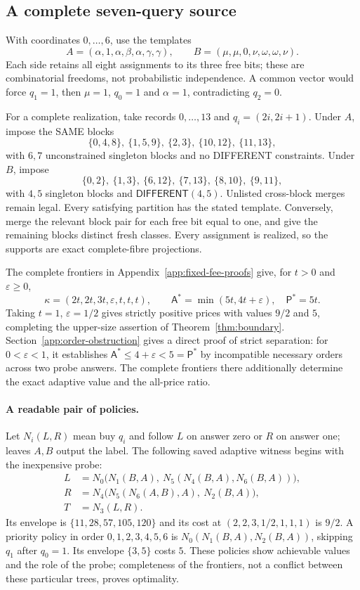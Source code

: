 \documentclass[pdflatex,sn-mathphys-num]{sn-jnl}
\newcommand{\A}{\mathsf{A}}
\newcommand{\Pcost}{\mathsf{P}}
\newcommand{\DIFF}{\mathsf{DIFFERENT}}
\theoremstyle{thmstyleone}
\theoremstyle{thmstylethree}
\theoremstyle{thmstyletwo}
\begin{document}
\subsection{A complete seven-query source}\label{sec:seven}
With coordinates $0,\ldots,6$, use the templates
\[
 A=(\alpha,1,\alpha,\beta,\alpha,\gamma,\gamma),\qquad
 B=(\mu,\mu,0,\nu,\omega,\omega,\nu).
\]
Each side retains all eight assignments to its three free bits; these are combinatorial freedoms, not probabilistic independence. A common vector would force $q_1=1$, then $\mu=1$, $q_0=1$ and $\alpha=1$, contradicting $q_2=0$.

For a complete realization, take records $0,\ldots,13$ and $q_i=(2i,2i+1)$. Under $A$, impose the SAME blocks
\[
 \{0,4,8\},\ \{1,5,9\},\ \{2,3\},\ \{10,12\},\ \{11,13\},
\]
with $6,7$ unconstrained singleton blocks and no DIFFERENT constraints. Under $B$, impose
\[
 \{0,2\},\ \{1,3\},\ \{6,12\},\ \{7,13\},\ \{8,10\},\ \{9,11\},
\]
with $4,5$ singleton blocks and $\DIFF(4,5)$. Unlisted cross-block merges remain legal. Every satisfying partition has the stated template. Conversely, merge the relevant block pair for each free bit equal to one, and give the remaining blocks distinct fresh classes. Every assignment is realized, so the supports are exact complete-fibre projections.

The complete frontiers in Appendix~\ref{app:fixed-fee-proofs} give, for $t>0$ and $\varepsilon\geq0$,
\[
 \kappa=(2t,2t,3t,\varepsilon,t,t,t),\qquad
 \A^*=\min(5t,4t+\varepsilon),\quad\Pcost^*=5t.
\]
Taking $t=1$, $\varepsilon=1/2$ gives strictly positive prices with values $9/2$ and $5$, completing the upper-size assertion of Theorem~\ref{thm:boundary}. Section~\ref{app:order-obstruction} gives a direct proof of strict separation: for $0<\varepsilon<1$, it establishes $\A^*\leq4+\varepsilon<5=\Pcost^*$ by incompatible necessary orders across two probe answers. The complete frontiers there additionally determine the exact adaptive value and the all-price ratio.

\paragraph*{A readable pair of policies.}
Let $N_i(L,R)$ mean buy $q_i$ and follow $L$ on answer zero or $R$ on answer one; leaves $A,B$ output the label. The following saved adaptive witness begins with the inexpensive probe:
\begin{align*}
 L&=N_0\bigl(N_1(B,A),\ N_5(N_4(B,A),N_6(B,A))\bigr),\\
 R&=N_4\bigl(N_5(N_6(A,B),A),\ N_2(B,A)\bigr),\\
 T&=N_3(L,R).
\end{align*}
Its envelope is $\{11,28,57,105,120\}$ and its cost at $(2,2,3,1/2,1,1,1)$ is $9/2$. A priority policy in order $0,1,2,3,4,5,6$ is $N_0(N_1(B,A),N_2(B,A))$, skipping $q_1$ after $q_0=1$. Its envelope $\{3,5\}$ costs $5$. These policies show achievable values and the role of the probe; completeness of the frontiers, not a conflict between these particular trees, proves optimality.
\end{document}
